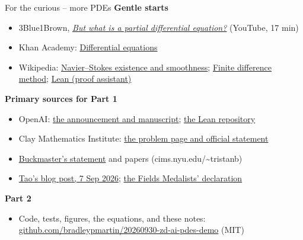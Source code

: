 \documentclass[aspectratio=169, 10pt]{beamer}
\begin{document}
\begin{frame}{For the curious -- more PDEs}
  \footnotesize
  \textbf{Gentle starts}
  \begin{itemize}
    \item 3Blue1Brown, \href{https://www.youtube.com/watch?v=ly4S0oi3Yz8}{\emph{But what is a partial differential equation?}} (YouTube, 17 min)
    \item Khan Academy: \href{https://www.khanacademy.org/math/differential-equations}{Differential equations}
    \item Wikipedia: \href{https://en.wikipedia.org/wiki/Navier\%E2\%80\%93Stokes_existence_and_smoothness}{Navier--Stokes existence and smoothness};
      \href{https://en.wikipedia.org/wiki/Finite_difference_method}{Finite difference method};
      \href{https://en.wikipedia.org/wiki/Lean_(proof_assistant)}{Lean (proof assistant)}
  \end{itemize}
  \textbf{Primary sources for Part 1}
  \begin{itemize}
    \item OpenAI: \href{https://openai.com/index/navier-stokes-solution/}{the announcement and manuscript}; \href{https://github.com/openai/NavierStokesAndEuler}{the Lean repository}
    \item Clay Mathematics Institute: \href{https://www.claymath.org/millennium/navier-stokes-equation/}{the problem page and official statement}
    \item \href{https://cims.nyu.edu/~tristanb/statement.pdf}{Buckmaster's statement} and papers (cims.nyu.edu/\textasciitilde tristanb)
    \item \href{https://terrytao.wordpress.com/2026/09/07/finite-time-blowup-with-smooth-forcing-term-for-the-incompressible-porous-medium-boussinesq-and-incompressible-euler-equations/}{Tao's blog post, 7 Sep 2026}; \href{https://mathandai.org/}{the Fields Medalists' declaration}
  \end{itemize}
  \textbf{Part 2}
  \begin{itemize}
    \item Code, tests, figures, the equations, and these notes: \href{https://github.com/bradleypmartin/20260930-zd-ai-pdes-demo}{github.com/bradleypmartin/20260930-zd-ai-pdes-demo} (MIT)
  \end{itemize}
\end{frame}
\end{document}
